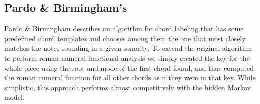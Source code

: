 \documentclass[a0paper]{sciposter}
\begin{document}
\begin{multicols}{3}
\subsection{Pardo \& Birmingham's}
\label{sec:pardo--birminghams}

Pardo \& Birmingham \cite{pardo.ea99:automated} describes an algorithm
for chord labeling that has some predefined chord templates and
chooses among them the one that most closely matches the notes
sounding in a given sonority. To extend the original algorithm to
perform roman numeral functional analysis we simply created the key
for the whole piece using the root and mode of the first chord found,
and thus computed the roman numeral function for all other chords as
if they were in that key. While simplistic, this approach performs
almost competitively with the hidden Markov model.

\end{multicols}
\end{document}
